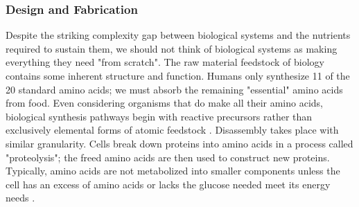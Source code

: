 {%
%
%
%

\subsubsection{Design and Fabrication}



Despite the striking complexity gap between biological systems and the nutrients required to sustain them, we should not think of biological systems as making everything they need "from scratch".  The raw material feedstock of biology contains some inherent structure and function.  Humans only synthesize 11 of the 20 standard amino acids; we must absorb the remaining "essential" amino acids from food.  Even considering organisms that do make all their amino acids, biological synthesis pathways begin with reactive precursors rather than exclusively elemental forms of atomic feedstock \cite{Stryer1988}.  Disassembly takes place with similar granularity.  Cells break down proteins into amino acids in a process called "proteolysis"; the freed amino acids are then used to construct new proteins.  Typically, amino acids are not metabolized into smaller components unless the cell has an excess of amino acids or lacks the glucose needed meet its energy needs \cite{Stryer1988}.\\

}
